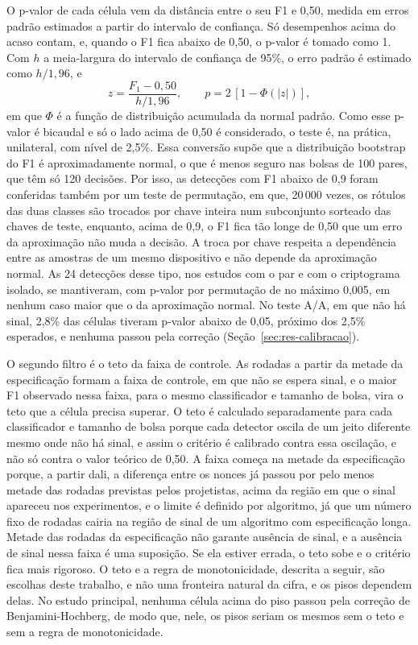 O p-valor de cada célula vem da distância entre o seu F1 e 0,50, medida em erros padrão estimados a partir do intervalo de confiança. Só desempenhos acima do acaso contam, e, quando o F1 fica abaixo de 0,50, o p-valor é tomado como 1. Com $h$ a meia-largura do intervalo de confiança de 95\%, o erro padrão é estimado como $h/1{,}96$, e
\begin{equation}
z = \frac{F_1 - 0{,}50}{h/1{,}96}, \qquad p = 2\,[1 - \Phi(|z|)],
\end{equation}
em que $\Phi$ é a função de distribuição acumulada da normal padrão. Como esse p-valor é bicaudal e só o lado acima de 0,50 é considerado, o teste é, na prática, unilateral, com nível de 2,5\%. Essa conversão supõe que a distribuição bootstrap do F1 é aproximadamente normal, o que é menos seguro nas bolsas de 100 pares, que têm só 120 decisões. Por isso, as detecções com F1 abaixo de 0,9 foram conferidas também por um teste de permutação, em que, 20\,000 vezes, os rótulos das duas classes são trocados por chave inteira num subconjunto sorteado das chaves de teste, enquanto, acima de 0,9, o F1 fica tão longe de 0,50 que um erro da aproximação não muda a decisão. A troca por chave respeita a dependência entre as amostras de um mesmo dispositivo e não depende da aproximação normal. As 24 detecções desse tipo, nos estudos com o par e com o criptograma isolado, se mantiveram, com p-valor por permutação de no máximo 0,005, em nenhum caso maior que o da aproximação normal. No teste A/A, em que não há sinal, 2,8\% das células tiveram p-valor abaixo de 0,05, próximo dos 2,5\% esperados, e nenhuma passou pela correção (Seção~\ref{sec:res-calibracao}).

O segundo filtro é o teto da faixa de controle. As rodadas a partir da metade da especificação formam a faixa de controle, em que não se espera sinal, e o maior F1 observado nessa faixa, para o mesmo classificador e tamanho de bolsa, vira o teto que a célula precisa superar. O teto é calculado separadamente para cada classificador e tamanho de bolsa porque cada detector oscila de um jeito diferente mesmo onde não há sinal, e assim o critério é calibrado contra essa oscilação, e não só contra o valor teórico de 0,50. A faixa começa na metade da especificação porque, a partir dali, a diferença entre os nonces já passou por pelo menos metade das rodadas previstas pelos projetistas, acima da região em que o sinal apareceu nos experimentos, e o limite é definido por algoritmo, já que um número fixo de rodadas cairia na região de sinal de um algoritmo com especificação longa. Metade das rodadas da especificação não garante ausência de sinal, e a ausência de sinal nessa faixa é uma suposição. Se ela estiver errada, o teto sobe e o critério fica mais rigoroso. O teto e a regra de monotonicidade, descrita a seguir, são escolhas deste trabalho, e não uma fronteira natural da cifra, e os pisos dependem delas. No estudo principal, nenhuma célula acima do piso passou pela correção de Benjamini-Hochberg, de modo que, nele, os pisos seriam os mesmos sem o teto e sem a regra de monotonicidade.

